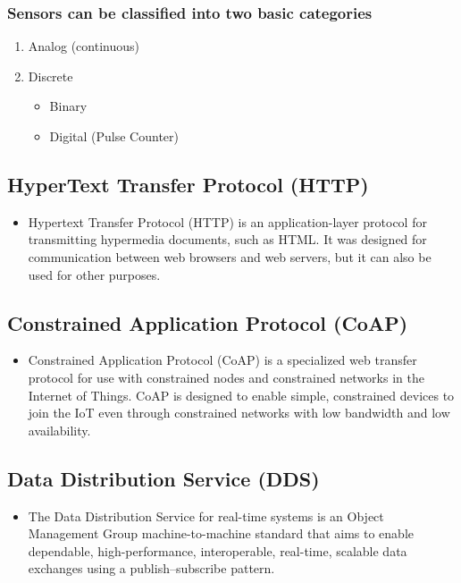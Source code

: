\documentclass[11pt]{article}
\begin{document}
\subsubsection{Sensors can be classified into two basic categories}
\label{sec:org752a133}
\begin{enumerate}
\item Analog (continuous)
\item Discrete
\begin{itemize}
\item Binary
\item Digital (Pulse Counter)
\end{itemize}
\end{enumerate}

\subsection{HyperText Transfer Protocol (HTTP)}
\label{sec:orgccdbc40}
\begin{itemize}
\item Hypertext Transfer Protocol (HTTP) is an application-layer protocol for transmitting hypermedia documents, such as HTML. It was designed for communication between web browsers and web servers, but it can also be used for other purposes.
\end{itemize}

\subsection{Constrained Application Protocol (CoAP)}
\label{sec:org5ea64cf}
\begin{itemize}
\item Constrained Application Protocol (CoAP) is a specialized web transfer protocol for use with constrained nodes and constrained networks in the Internet of Things. CoAP is designed to enable simple, constrained devices to join the IoT even through constrained networks with low bandwidth and low availability.
\end{itemize}

\subsection{Data Distribution Service (DDS)}
\label{sec:orgdaa3728}
\begin{itemize}
\item The Data Distribution Service for real-time systems is an Object Management Group machine-to-machine standard that aims to enable dependable, high-performance, interoperable, real-time, scalable data exchanges using a publish–subscribe pattern.
\end{itemize}
\end{document}
